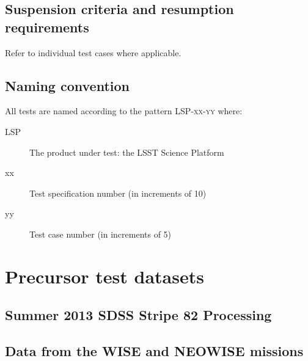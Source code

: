 \documentclass[DM,lsstdraft,STS,toc]{lsstdoc}
\begin{document}
\subsection{Suspension criteria and resumption requirements}
\label{suspension}

Refer to individual test cases where applicable.

\subsection{Naming convention}

All tests are named according to the pattern \textsc{LSP-xx-yy} where:

\begin{description}

  \item[LSP]{The product under test: the LSST Science Platform}
  \item[xx]{Test specification number (in increments of 10)}
  \item[yy]{Test case number (in increments of 5)}

\end{description}




\appendix

\section{Precursor test datasets}

\subsection{Summer 2013 SDSS Stripe 82 Processing}

\subsection{Data from the WISE and NEOWISE missions}
\end{document}
